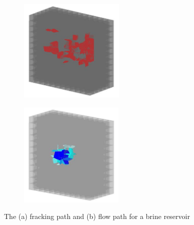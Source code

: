 \begin{figure}[!ht]
\begin{subfigure}[c]{0.48\textwidth}
\centering
\includegraphics[width=5cm,height=5cm]{figures/Amir_ME4_Brine_Frack.png}
\subcaption{}
\label{fig:Amir_ME4_Brine_Frack}
\end{subfigure}
\hfill
\begin{subfigure}[c]{0.48\textwidth}
\centering
\includegraphics[width=5cm,height=5cm]{figures/Amir_ME4_Brine_Flow.png}
\subcaption{}
\label{fig:Amir_ME4_Brine_Flow}
\end{subfigure}
\caption{The (a) fracking path and (b) flow path for a brine reservoir}
\end{figure}

